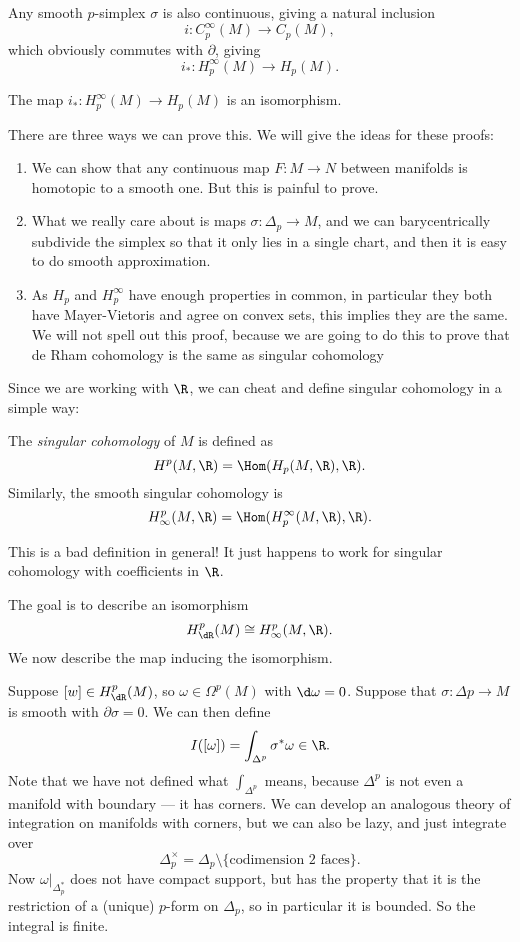 \documentclass[a4paper]{article}
\begin{document}
Any smooth $p$-simplex $\sigma$ is also continuous, giving a natural inclusion
\[
  i: C_p^\infty(M) \to C_p(M),
\]
which obviously commutes with $\partial$, giving
\[
  i_*: H_p^\infty(M) \to H_p(M).
\]
\begin{thm}
  The map $i_*: H_p^\infty(M) \to H_p(M)$ is an isomorphism.
\end{thm}

There are three ways we can prove this. We will give the ideas for these proofs:
\begin{enumerate}
  \item We can show that any continuous map $F: M \to N$ between manifolds is homotopic to a smooth one. But this is painful to prove.
  \item What we really care about is maps $\sigma: \Delta_p \to M$, and we can barycentrically subdivide the simplex so that it only lies in a single chart, and then it is easy to do smooth approximation.
  \item As $H_p$ and $H_p^\infty$ have enough properties in common, in particular they both have Mayer-Vietoris and agree on convex sets, this implies they are the same. We will not spell out this proof, because we are going to do this to prove that de Rham cohomology is the same as singular cohomology
\end{enumerate}

Since we are working with $\R$, we can cheat and define singular cohomology in a simple way:
\begin{defi}
  The \emph{singular cohomology} of $M$ is defined as
  \[
    H^p(M, \R) = \Hom(H_p(M, \R), \R).
  \]
  Similarly, the smooth singular cohomology is
  \[
    H^p_\infty(M, \R) = \Hom(H_p^\infty(M, \R), \R).
  \]
\end{defi}
This is a bad definition in general! It just happens to work for singular cohomology with coefficients in $\R$.

The goal is to describe an isomorphism
\[
  H^p_{\dR}(M) \cong H^p_\infty(M, \R).
\]
We now describe the map inducing the isomorphism.

Suppose $[w] \in H^p_{\dR}(M)$, so $\omega \in \Omega^p(M)$ with $\d \omega = 0$. Suppose that $\sigma: \Delta p \to M$ is smooth with $\partial \sigma = 0$. We can then define
\[
  I([\omega]) = \int_{\Delta^p} \sigma^* \omega \in \R.
\]
Note that we have not defined what $\int_{\Delta^p}$ means, because $\Delta^p$ is not even a manifold with boundary --- it has corners. We can develop an analogous theory of integration on manifolds with corners, but we can also be lazy, and just integrate over
\[
  \Delta_p^\times = \Delta_p \setminus \{\text{codimension 2 faces}\}.
\]
Now $\omega|_{\Delta_p^*}$ does not have compact support, but has the property that it is the restriction of a (unique) $p$-form on $\Delta_p$, so in particular it is bounded. So the integral is finite.
\end{document}

